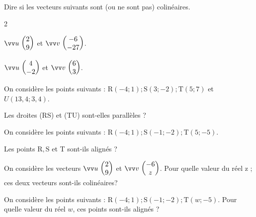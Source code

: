\documentclass[10pt,a4paper]{article}  %
\begin{document}
\begin{enumMet}
  \item Dire si les vecteurs suivants sont (ou ne sont pas) colinéaires.
	\begin{multicols}{2}
		\begin{enumMet}
		\item $\Coord{u}{2}{9}$ et $\Coord{v}{-6}{-27}$.
		\item $\Coord{u}{4}{-2}$ et $\Coord{v}{6}{3}$.
	\end{enumMet}
	\end{multicols}
  \item On considère les points suivants : $\mathrm{R}(-4 ; 1) ; \mathrm{S}(3 ;-2) ; \mathrm{T}(5 ; 7)$ et $U(13,4 ; 3,4)$.
  
  Les droites (RS) et (TU) sont-elles parallèles ?
  \item On considère les points suivants : $\mathrm{R}(-4 ; 1) ; \mathrm{S}(-1 ;-2) ; \mathrm{T}(5 ;-5)$.
  
  Les points $\mathrm{R}, \mathrm{S}$ et T sont-ils alignés ?
  \item On considère les vecteurs $\Coord{u}{2}{9}$ et $\Coord{v}{-6}{z}$. Pour quelle valeur du réel z ; ces deux vecteurs sont-ils colinéaires?
  \item On considère les points suivants : $\mathrm{R}(-4 ; 1) ; \mathrm{S}(-1 ;-2) ; \mathrm{T}(w ;-5)$. Pour quelle valeur du réel $w$, ces points sont-ils alignés ?
\end{enumMet}
\end{document}
